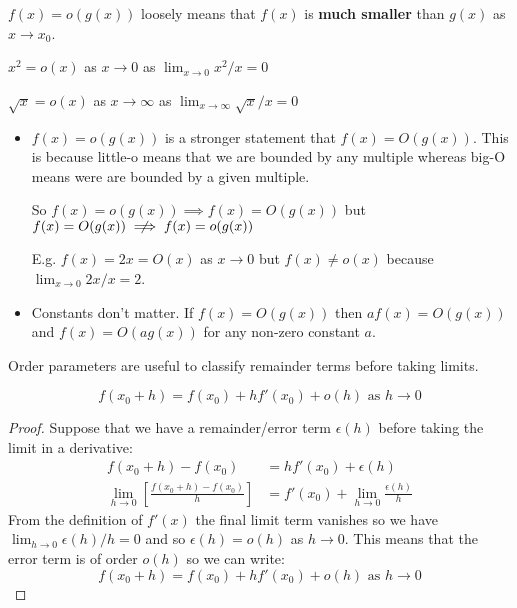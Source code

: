 \documentclass[../main.tex]{subfiles}
\begin{document}
$f(x) = o(g(x))$ loosely means that $f(x)$ is \textbf{much smaller} than $g(x)$ as $x \to x_0$. 
\begin{example}
 $x^2 = o(x)$ as $x \to 0$ as $\lim_{x \to 0} x^2/x = 0$
\end{example}
\begin{example}
  $\sqrt{x} = o(x)$ as $x \to \infty$ as $\lim_{x \to \infty} \sqrt{x}/x = 0$
\end{example}
\begin{remark}[Notes]
  \begin{itemize}
    \item $f(x) = o(g(x))$ is a stronger statement that $f(x) = O(g(x))$. 
      This is because little-o means that we are bounded by any multiple whereas big-O means were are bounded by a given multiple.

      So $f(x) = o(g(x)) \implies f(x) = O(g(x))$ but $f(x) = O(g(x)) \centernot\implies f(x) = o(g(x))$

      E.g. $f(x) = 2x = O(x)$ as $x \to 0$ but $f(x) \neq o(x)$ because $\lim_{x \to 0} 2x/x = 2$.
    \item Constants don't matter. If $f(x) = O(g(x))$ then $af(x) = O(g(x))$ and $f(x) = O(ag(x))$ for any non-zero constant $a$.
  \end{itemize} 
\end{remark}
Order parameters are useful to classify remainder terms before taking limits.
\begin{proposition}
  \[
    f(x_0 + h) = f(x_0) + hf'(x_0) + o(h) \text{ as } h\to0
    \label{derivLittle}
  \]
\end{proposition}
\begin{proof}
  Suppose that we have a remainder/error term $\epsilon(h)$ before taking the limit in a derivative:
  \begin{align*}
    f(x_0 + h) - f(x_0) &= hf'(x_0) + \epsilon(h) \\
    \lim_{h \to 0} \left[\frac{f(x_0 + h) - f(x_0)}{h}\right] &= f'(x_0) + \lim_{h \to 0} \frac{\epsilon(h)}{h}
  \end{align*}
  From the definition of $f'(x)$ the final limit term vanishes so we have $\lim_{h \to 0} \epsilon(h)/h = 0$ and so $\epsilon(h) = o(h)$ as $h\to0$.
  This means that the error term is of order $o(h)$ so we can write:
  \[
    f(x_0 + h) = f(x_0) + hf'(x_0) + o(h) \text{ as } h\to0
  \]
\end{proof}
\end{document}
